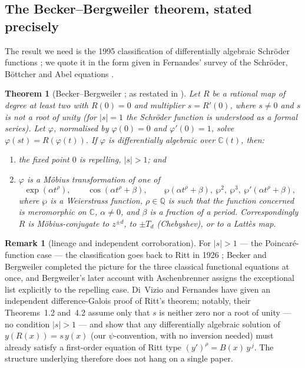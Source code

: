\documentclass[11pt,a4paper]{article}
\theoremstyle{plain}
\newtheorem{theorem}{Theorem}[section]
\theoremstyle{definition}
\newtheorem{remark}{Remark}[section]
\begin{document}
\subsection{The Becker--Bergweiler theorem, stated precisely}

The result we need is the 1995 classification of differentially algebraic Schr\"oder functions \cite{Becker1995}; we quote it in the form given in Fernandes' survey of the Schr\"oder, B\"ottcher and Abel equations \cite[Thm~3.1]{Fernandes2021}.

\begin{theorem}[Becker--Bergweiler \cite{Becker1995}; as restated in {\cite[Thm~3.1]{Fernandes2021}}]
\label{thm:BB-main}
Let $R$ be a rational map of degree at least two with $R(0)=0$ and multiplier $s=R'(0)$, where $s\neq0$ and $s$ is not a root of unity (for $|s|=1$ the Schr\"oder function is understood as a formal series). Let $\varphi$, normalised by $\varphi(0)=0$ and $\varphi'(0)=1$, solve $\varphi(st)=R(\varphi(t))$. If $\varphi$ is differentially algebraic over $\mathbb{C}(t)$, then:
\begin{enumerate}[label=\textup{(\roman*)}]
\item the fixed point $0$ is \emph{repelling}, $|s|>1$; and
\item $\varphi$ is a M\"obius transformation of one of
\[
\exp(\alpha t^{\rho}),
\qquad
\cos(\alpha t^{\rho}+\beta),
\qquad
\wp(\alpha t^{\rho}+\beta),\ \wp^{2},\ \wp^{3},\ \wp'(\alpha t^{\rho}+\beta),
\]
where $\wp$ is a Weierstrass function, $\rho\in\mathbb{Q}$ is such that the function concerned is meromorphic on $\mathbb{C}$, $\alpha\neq0$, and $\beta$ is a fraction of a period. Correspondingly $R$ is M\"obius-conjugate to $z^{\pm d}$, to $\pm T_d$ (Chebyshev), or to a Latt\`es map.
\end{enumerate}
\end{theorem}

\begin{remark}[lineage and independent corroboration]
\label{rem:lineage}
For $|s|>1$ --- the Poincar\'e-function case --- the classification goes back to Ritt in 1926 \cite{Ritt1926}; Becker and Bergweiler completed the picture for the three classical functional equations at once, and Bergweiler's later account with Aschenbrenner \cite{AschenbrennerBergweiler2015} assigns the exceptional list explicitly to the repelling case. Di~Vizio and Fernandes \cite{DiVizioFernandes2021} have given an independent difference-Galois proof of Ritt's theorem; notably, their Theorems~1.2 and~4.2 assume only that $s$ is neither zero nor a root of unity --- no condition $|s|>1$ --- and show that any differentially algebraic solution of $y(R(x))=s\,y(x)$ (our $\psi$-convention, with no inversion needed) must already satisfy a first-order equation of Ritt type $(y')^{\rho}=B(x)\,y^{\,j}$. The structure underlying  therefore does not hang on a single paper.
\end{remark}
\end{document}
